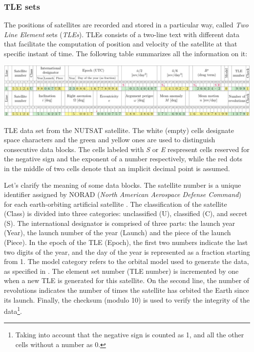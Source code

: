 \documentclass[../main.tex]{subfiles}
\begin{document}
\subsubsection{TLE sets}
The positions of satellites are recorded and stored in a particular way, called \emph{Two Line Element} sets (\emph{TLEs}). TLEs consists of a two-line text with different data that facilitate the computation of position and velocity of the satellite at that specific instant of time. The following table summarizes all the information on it:

\begin{table}[ht]
  \centering
  \begin{minipage}[ht]{\textwidth}
    \centering
    \includegraphics[width=\textwidth]{Images/TLE.pdf}
  \end{minipage}
  \caption{TLE data set from the NUTSAT satellite. The white (empty) cells designate space characters and the green and yellow ones are used to distinguish consecutive data blocks. The cells labeled with \textit{S} or \textit{E} respresent cells reserved for the negative sign and the exponent of a number respectively, while the red dots in the middle of two cells denote that an implicit decimal point is assumed.}
  \label{tab:TLE}
\end{table}
Let's clarify the meaning of some data blocks. The satellite number is a unique identifier assigned by NORAD (\emph{North American Aerospace Defense Command}) for each earth-orbiting artificial satellite \cite{celestrak}. The classification of the satellite (Class) is divided into three categories: unclassified (U), classified (C), and secret (S). The international designator is comprised of three parts: the launch year (Year), the launch number of the year (Launch) and the piece of the launch (Piece). In the epoch of the TLE (Epoch), the first two numbers indicate the last two digits of the year, and the day of the year is represented as a fraction starting from 1. The model category refers to the orbital model used to generate the data, as specified in \cite{celestrak,wiki:spg}. The element set number (TLE number) is incremented by one when a new TLE is generated for this satellite. On the second line, the number of revolutions indicates the number of times the satellite has orbited the Earth since its launch. Finally, the checksum (modulo 10) is used to verify the integrity of the data\footnote{Taking into account that the negative sign is counted as 1, and all the other cells without a number as 0.}.
\end{document}
